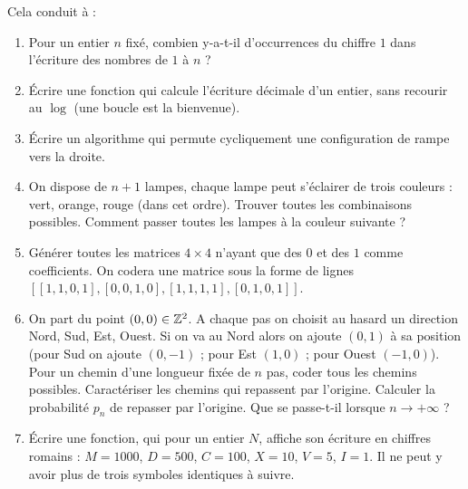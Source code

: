\documentclass[class=report,crop=false]{standalone}
\begin{document}
\begin{enumerate}
Cela conduit à :


\end{enumerate}



\begin{miniexercices}
\begin{enumerate}
  \item Pour un entier $n$ fixé, combien y-a-t-il d'occurrences du chiffre $1$ dans
  l'écriture des nombres de $1$ à $n$ ?

  \item \'Ecrire une fonction qui calcule l'écriture décimale d'un entier, sans recourir au $\log$
  (une boucle  est la bienvenue).

  \item \'Ecrire un algorithme qui permute cycliquement une configuration de rampe vers la droite.

  \item On dispose de $n+1$ lampes, chaque lampe peut s'éclairer de trois couleurs : vert, orange, rouge (dans cet ordre).
  Trouver toutes les combinaisons possibles. Comment passer toutes les lampes à la couleur suivante ?

  \item Générer toutes les matrices $4\times 4$ n'ayant que des $0$ et des $1$ comme coefficients.
  On codera une matrice sous la forme de lignes $[ [1,1,0,1], [0,0,1,0], [1,1,1,1], [0,1,0,1] ]$.

  \item On part du point $(0,0) \in \mathbb{Z}^2$. A chaque pas on choisit au hasard un direction Nord, Sud, Est, Ouest.
  Si on va au Nord alors on ajoute $(0,1)$ à sa position (pour Sud on ajoute $(0,-1)$ ; pour Est $(1,0)$ ; pour Ouest $(-1,0)$).
  Pour un chemin d'une longueur fixée de $n$ pas, coder tous les chemins possibles. Caractériser les chemins qui repassent par l'origine.
  Calculer la probabilité $p_n$ de repasser par l'origine. Que se passe-t-il lorsque $n \to +\infty$ ?

  \item \'Ecrire une fonction, qui pour un entier $N$, affiche son écriture en chiffres romains :
  $M = 1000$, $D=500$, $C=100$, $X=10$, $V=5$, $I=1$. Il ne peut y avoir plus de trois symboles identiques à suivre.

\end{enumerate}
\end{miniexercices}
\end{document}
